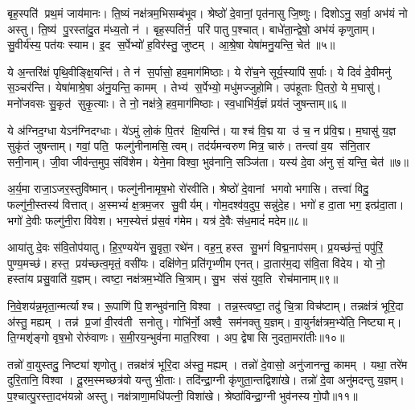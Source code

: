 बृह॒स्पति॑ प्रथ॒मं जाय॑मानः।
ति॒ष्यं नक्ष॑त्रम॒भिसम्ब॑भूव।
श्रेष्ठो॑ दे॒वानां॒ पृत॑नासु जि॒ष्णुः।
दिशोऽनु॒ सर्वा॒ अभ॑यं नो अस्तु।
ति॒ष्य॑ पु॒रस्ता॑दु॒त म॑ध्य॒तो न॑।
बृह॒स्पति॑र्न॒ परि॑ पातु प॒श्चात्।
बाधे॑ता॒न्द्वेषो॒ अभ॑यं कृणुताम्।
सु॒वीर्य॑स्य॒ पत॑यः स्याम।
इ॒द स॒र्पेभ्यो॑ ह॒विर॑स्तु॒ जुष्टम्।
आ॒श्रे॒षा येषा॑मनु॒यन्ति॒ चेत॑॥५॥

ये अ॒न्तरि॑क्षं पृथि॒वीङ्क्षि॒यन्ति॑।
ते न॑ स॒र्पासो॒ हव॒माग॑मिष्ठाः।
ये रो॑च॒ने सूर्य॒स्यापि॑ स॒र्पाः।
ये दिवं॑ दे॒वीमनु॑ स॒ञ्चर॑न्ति।
येषा॑माश्रे॒षा अ॑नु॒यन्ति॒ कामम्।
तेभ्य॑ स॒र्पेभ्यो॒ मधु॑मज्जुहोमि।
उप॑हूताः पि॒तरो॒ ये म॒घासु॑।
मनो॑जवसः सु॒कृत॑ सुकृ॒त्याः।
ते नो॒ नक्ष॑त्रे॒ हव॒माग॑मिष्ठाः।
स्व॒धाभि॑र्य॒ज्ञं प्रय॑तं जुषन्ताम्॥६॥

ये अ॑ग्निद॒ग्धा येऽन॑ग्निदग्धाः।
ये॑ऽमुं लो॒कं पि॒तर॑ क्षि॒यन्ति॑।
याश्च॑ वि॒द्म या उ॑ च॒ न प्र॑वि॒द्म।
म॒घासु॑ य॒ज्ञ सुकृ॑तं जुषन्ताम्।
गवां॒ पति॒ फल्गु॑नीनामसि॒ त्वम्।
तद॑र्यमन्वरुण मित्र॒ चारु॑।
तन्त्वा॑ व॒य स॑नि॒तार सनी॒नाम्।
जी॒वा जीव॑न्त॒मुप॒ संवि॑शेम।
येने॒मा विश्वा॒ भुव॑नानि॒ सञ्जि॑ता।
यस्य॑ दे॒वा अ॑नु सं॒ यन्ति॒ चेत॑॥७॥

अ॒र्य॒मा राजा॒ऽजर॒स्तुवि॑ष्मान्।
फल्गु॑नीनामृष॒भो रो॑रवीति।
श्रेष्ठो॑ दे॒वानां भगवो भगासि।
तत्त्वा॑ विदु॒ फल्गु॑नी॒स्तस्य॑ वित्तात्।
अ॒स्मभ्यं॑ क्ष॒त्रम॒जर सु॒वीर्यम्।
गोम॒दश्व॑व॒दुप॒ सन्नु॑दे॒ह।
भगो॑ ह दा॒ता भग॒ इत्प्र॑दा॒ता।
भगो॑ दे॒वीः फल्गु॑नी॒रा वि॑वेश।
भग॒स्येत्तं प्र॑स॒वं ग॑मेम।
यत्र॑ दे॒वैः स॑ध॒मादं॑ मदेम॥८॥

आया॑तु दे॒वः स॑वि॒तोप॑यातु।
हि॒र॒ण्यये॑न सु॒वृता॒ रथे॑न।
वह॒न्॒ हस्त सु॒भगं॑ विद्म॒नाप॑सम्।
प्र॒यच्छ॑न्तं॒ पपु॑रिं॒ पुण्य॒मच्छ॑।
हस्त॒ प्रय॑च्छत्व॒मृतं॒ वसी॑यः।
दक्षि॑णेन॒ प्रति॑गृभ्णीम एनत्।
दा॒तार॑म॒द्य स॑वि॒ता वि॑देय।
यो नो॒ हस्ता॑य प्रसु॒वाति॑ य॒ज्ञम्।
त्वष्टा॒ नक्ष॑त्रम॒भ्ये॑ति चि॒त्राम्।
सु॒भ स॑सं युव॒ति रोच॑मानाम्॥९॥

नि॒वे॒शय॑न्न॒मृता॒न्मर्त्याश्च।
रू॒पाणि॑ पि॒शन्भुव॑नानि॒ विश्वा।
तन्न॒स्त्वष्टा॒ तदु॑ चि॒त्रा विच॑ष्टाम्।
तन्नक्ष॑त्रं भूरि॒दा अ॑स्तु॒ मह्यम्।
तन्न॑ प्र॒जां वी॒रव॑ती सनोतु।
गोभि॑र्नो॒ अश्वै॒ सम॑नक्तु य॒ज्ञम्।
वा॒युर्नक्ष॑त्रम॒भ्ये॑ति॒ निष्ट्याम्।
ति॒ग्मशृ॑ङ्गो वृष॒भो रोरु॑वाणः।
स॒मी॒रय॒न्भुव॑ना मात॒रिश्वा।
अप॒ द्वेषासि नुदता॒मरा॑तीः॥१०॥

तन्नो॑ वा॒युस्तदु॒ निष्ट्या॑ शृणोतु।
तन्नक्ष॑त्रं भूरि॒दा अ॑स्तु॒ मह्यम्।
तन्नो॑ दे॒वासो॒ अनु॑जानन्तु॒ कामम्।
यथा॒ तरे॑म दुरि॒तानि॒ विश्वा।
दू॒रम॒स्मच्छत्र॑वो यन्तु भी॒ताः।
तदि॑न्द्रा॒ग्नी कृ॑णुता॒न्तद्विशा॑खे।
तन्नो॑ दे॒वा अनु॑मदन्तु य॒ज्ञम्।
प॒श्चात्पु॒रस्ता॒दभ॑यन्नो अस्तु।
नक्ष॑त्राणा॒मधि॑पत्नी॒ विशा॑खे।
श्रेष्ठा॑विन्द्रा॒ग्नी भुव॑नस्य गो॒पौ॥११॥

